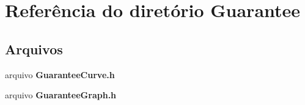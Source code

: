 \section{Referência do diretório Guarantee}
\label{dir_a1fb4da7c61db07c9f72cedc493a3866}
\subsection*{Arquivos}
\begin{DoxyCompactItemize}
\item 
arquivo {\bf Guarantee\+Curve.\+h}
\item 
arquivo {\bf Guarantee\+Graph.\+h}
\end{DoxyCompactItemize}
